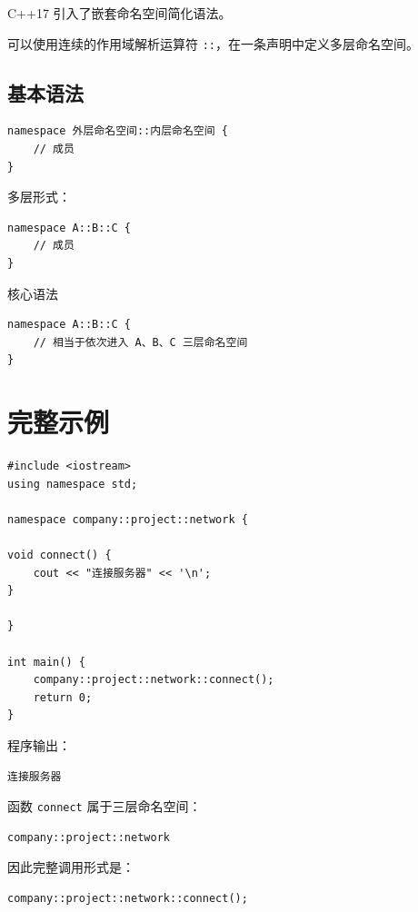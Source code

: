 \documentclass[UTF8,12pt,a4paper]{ctexart}
\begin{document}
C++17 引入了嵌套命名空间简化语法。

可以使用连续的作用域解析运算符 \texttt{::}，在一条声明中定义多层命名空间。

\subsection{基本语法}

\begin{lstlisting}
namespace 外层命名空间::内层命名空间 {
    // 成员
}
\end{lstlisting}

多层形式：

\begin{lstlisting}
namespace A::B::C {
    // 成员
}
\end{lstlisting}


\begin{conceptbox}{核心语法}
\begin{lstlisting}
namespace A::B::C {
    // 相当于依次进入 A、B、C 三层命名空间
}
\end{lstlisting}
\end{conceptbox}

\section{完整示例}

\begin{lstlisting}
#include <iostream>
using namespace std;

namespace company::project::network {

void connect() {
    cout << "连接服务器" << '\n';
}

}

int main() {
    company::project::network::connect();
    return 0;
}
\end{lstlisting}

程序输出：

\begin{verbatim}
连接服务器
\end{verbatim}

函数 \texttt{connect} 属于三层命名空间：

\begin{lstlisting}
company::project::network
\end{lstlisting}

因此完整调用形式是：

\begin{lstlisting}
company::project::network::connect();
\end{lstlisting}
\end{document}
